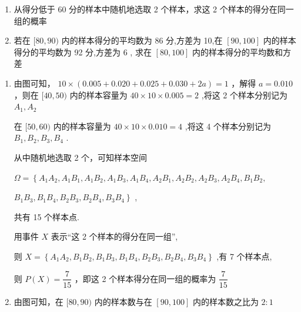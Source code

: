 \begin{enumerate}
\begin{enumerate}
        \begin{enumerate}
            \item 从得分低于 60 分的样本中随机地选取 2 个样本，求这 2 个样本的得分在同一组的概率
            \item 若在 $\lbrack {80},{90})$ 内的样本得分的平均数为 86 分,方差为 10,在 $\left\lbrack  {{90},{100}}\right\rbrack$ 内的样本得分的平均数为 92 分,方差为 6 , 求在 $\left\lbrack  {{80},{100}}\right\rbrack$ 内的样本得分的平均数和方差
        \end{enumerate}
        \begin{jieda}
            \begin{enumerate}
                \item 由图可知， ${{10} \times  \left( {{0.005} + {0.020} + {0.025} + {0.030} + {2a}}\right) } = 1$ ，解得 $a = {0.010}$ ，则在 $\lbrack {40},{50})$ 内的样本容量为 ${40} \times  {10} \times  {0.005} = 2$ ,将这 2 个样本分别记为 ${{A}}_{1},{{A}}_{2}$
                
                在 $\lbrack {50},{60})$ 内的样本容量为 ${40} \times  {10} \times  {0.010} = 4$ ,将这 4 个样本分别记为 ${{B}}_{1},{{B}}_{2},{{B}}_{3},{{B}}_{4}$ .
                
                从中随机地选取 2 个，可知样本空间
                
                $\Omega  = \left\{  {{{A}}_{1}{{A}}_{2},{{A}}_{1}{{B}}_{1},{{A}}_{1}{{B}}_{2},{{A}}_{1}{{B}}_{3},{{A}}_{1}{{B}}_{4},{{A}}_{2}{{B}}_{1},{{A}}_{2}{{B}}_{2},{{A}}_{2}{{B}}_{3},{{A}}_{2}{{B}}_{4},{{B}}_{1}{{B}}_{2},}\right.$
                
                $\left. {{{B}}_{1}{{B}}_{3},{{B}}_{1}{{B}}_{4},{{B}}_{2}{{B}}_{3},{{B}}_{2}{{B}}_{4},{{B}}_{3}{{B}}_{4}}\right\}$ ,
                
                共有 15 个样本点.
                
                用事件 $X$ 表示“这 2 个样本的得分在同一组”,
                
                则 $X = \left\{  {{A}_{1}{A}_{2},{B}_{1}{B}_{2},{B}_{1}{B}_{3},{B}_{1}{B}_{4},{B}_{2}{B}_{3},{B}_{2}{B}_{4},{B}_{3}{B}_{4}}\right\}$ ,有 7 个样本点,
                
                则 $P\left( X\right)  = \dfrac{7}{15}$ ，即这 2 个样本得分在同一组的概率为 $\dfrac{7}{15}$

                \item 由图可知，在 $\lbrack {80},{90})$ 内的样本数与在 $\left\lbrack  {{90},{100}}\right\rbrack$ 内的样本数之比为 $2 : 1$
                

\end{enumerate}
\end{jieda}
\end{enumerate}
\end{enumerate}
